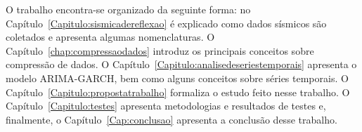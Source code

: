 O trabalho encontra-se organizado da seguinte forma: no
Capítulo~\ref{Capitulo:sismicadereflexao} é explicado como dados sísmicos são
coletados e apresenta algumas nomenclaturas. O
Capítulo~\ref{chap:compressaodados} introduz os principais conceitos sobre
compressão de dados. O Capítulo~\ref{Capitulo:analisedeseriestemporais}
apresenta o modelo ARIMA-GARCH, bem como alguns conceitos sobre séries
temporais. O Capítulo~\ref{Capitulo:propostatrabalho} formaliza o estudo feito
nesse trabalho. O Capítulo~\ref{Capitulo:testes} apresenta
metodologias e resultados de testes e, finalmente, o
Capítulo~\ref{Cap:conclusao} apresenta a conclusão desse trabalho.
